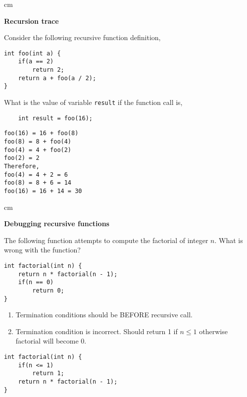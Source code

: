 \begin{questions}

 cm 

\question  \textbf{Recursion trace} \vskip 0.5cm

Consider the following recursive function definition,

\begin{lstlisting}
int foo(int a) {
	if(a == 2)
		return 2;
	return a + foo(a / 2);
}
\end{lstlisting}

What is the value of variable \texttt{result} if the function call is,

\begin{lstlisting}
	int result = foo(16);
\end{lstlisting}

\begin{solution}
\begin{verbatim}
foo(16) = 16 + foo(8)
foo(8) = 8 + foo(4)
foo(4) = 4 + foo(2)
foo(2) = 2
Therefore,
foo(4) = 4 + 2 = 6
foo(8) = 8 + 6 = 14
foo(16) = 16 + 14 = 30
\end{verbatim}
\end{solution}

 cm 

\question  \textbf{Debugging recursive functions} \vskip 0.5cm

The following function attempts to compute the factorial of integer $n$. What is wrong with the function?

\begin{lstlisting}
int factorial(int n) {
	return n * factorial(n - 1);
	if(n == 0)
		return 0;
}
\end{lstlisting}

\begin{solution}
\begin{enumerate}
\item Termination conditions should be BEFORE recursive call.
\item Termination condition is incorrect. Should return 1 if $n \leq 1$ otherwise factorial will become 0.
\end{enumerate}

\begin{lstlisting}
int factorial(int n) {
	if(n <= 1)
		return 1;
	return n * factorial(n - 1);
}
\end{lstlisting}
	
\end{solution}


\end{questions}

